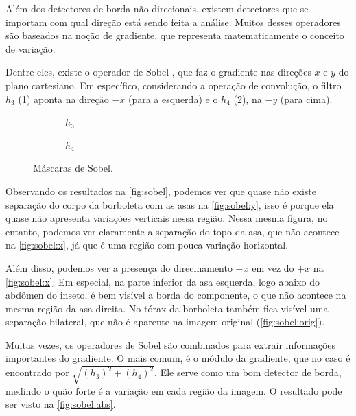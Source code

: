 Além dos detectores de borda não-direcionais, existem detectores que se importam com qual direção está sendo feita a análise. Muitos desses operadores são baseados na noção de gradiente, que representa matematicamente o conceito de variação.

Dentre eles, existe o operador de Sobel \autocite{ref:sobel}, que faz o gradiente nas direções $x$ e $y$ do plano cartesiano. Em específico, considerando a operação de convolução, o filtro $h_3$ (\ref{fig:h3}) aponta na direção $-x$ (para a esquerda) e o $h_4$ (\ref{fig:h4}), na $-y$ (para cima).

\begin{figure}[H]
    \centering
    \begin{subfigure}{0.4\textwidth}
        \centering
        
        \caption{~$h_3$}
        \label{fig:h3}
    \end{subfigure}%
    \begin{subfigure}{0.4\textwidth}
        \centering
        
        \caption{~$h_4$}
        \label{fig:h4}
    \end{subfigure}

    \caption{Máscaras de Sobel.}
    \label{fig:sobel:kernel}
\end{figure}

Observando os resultados na \cref{fig:sobel}, podemos ver que quase não existe separação do corpo da borboleta com as asas na \cref{fig:sobel:y}, isso é porque ela quase não apresenta variações verticais nessa região. Nessa mesma figura, no entanto, podemos ver claramente a separação do topo da asa, que não acontece na \cref{fig:sobel:x}, já que é uma região com pouca variação horizontal.

Além disso, podemos ver a presença do direcinamento $-x$ em vez do $+x$ na \ref{fig:sobel:x}. Em especial, na parte inferior da asa esquerda, logo abaixo do abdômen do inseto, é bem visível a borda do componente, o que não acontece na mesma região da asa direita. No tórax da borboleta também fica visível uma separação bilateral, que não é aparente na imagem original (\ref{fig:sobel:orig}).

Muitas vezes, os operadores de Sobel são combinados para extrair informações importantes do gradiente. O mais comum, é o módulo da gradiente, que no caso é encontrado por $\sqrt{\left(h_3\right)^2 + \left(h_4\right)^2}$. Ele serve como um bom detector de borda, medindo o quão forte é a variação em cada região da imagem. O resultado pode ser visto na \cref{fig:sobel:abs}.

